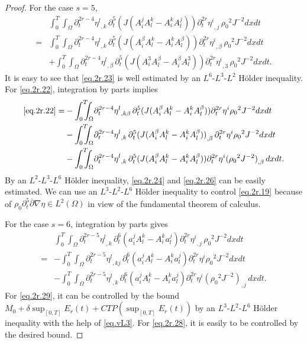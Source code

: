 \documentclass[12pt,twoside,reqno]{amsart}
\numberwithin{equation}{section}
\theoremstyle{definition}
\theoremstyle{remark}
\begin{document}
\begin{proof}
For the case $s=5$,
\begin{align}
  &{\int_0^T\!\!\!\!\int_\Omega } {\partial}_t^{2r-4}{{{\eta^l}}_{,{k}}\,}{\partial}_t^5(J(A_i^jA_l^k-A_i^kA_l^j)) {{{{\partial}_t^{2r}\eta^i}}_{,{j}}\,}{\rho_0}^2  J^{-2}dxdt\label{eq.2r.21}\\
  =&{\int_0^T\!\!\!\!\int_\Omega } {\partial}_t^{2r-4}{{{\eta^l}}_{,{k}}\,}{\partial}_t^5(J(A_i^\beta A_l^k-A_i^kA_l^\beta)) {{{{\partial}_t^{2r}\eta^i}}_{,{\beta}}\,}{\rho_0}^2  J^{-2}dxdt\label{eq.2r.22}\\
  &+{\int_0^T\!\!\!\!\int_\Omega } {\partial}_t^{2r-4}{{{\eta^l}}_{,{\beta}}\,}{\partial}_t^5(J(A_i^3A_l^\beta-A_i^\beta A_l^3)) {{{{\partial}_t^{2r}\eta^i}}_{,{3}}\,}{\rho_0}^2  J^{-2}dxdt.\label{eq.2r.23}
\end{align}
It is easy to see that \eqref{eq.2r.23} is well estimated by an $L^6$-$L^3$-$L^2$ H\"older inequality. For \eqref{eq.2r.22}, integration by parts implies
\begin{align}
  \eqref{eq.2r.22}=&-{\int_0^T\!\!\!\!\int_\Omega } {\partial}_t^{2r-4}{{{\eta^l}}_{,{k\beta}}\,}{\partial}_t^5(J(A_i^\beta A_l^k-A_i^kA_l^\beta)) {\partial}_t^{2r}\eta^i{\rho_0}^2  J^{-2}dxdt\label{eq.2r.24}\\
  &-{\int_0^T\!\!\!\!\int_\Omega } {\partial}_t^{2r-4}{{{\eta^l}}_{,{k}}\,}{\partial}_t^5{{{(J(A_i^\beta A_l^k-A_i^kA_l^\beta))}}_{,{\beta}}\,} {\partial}_t^{2r}\eta^i{\rho_0}^2  J^{-2}dxdt\label{eq.2r.25}\\
  &-{\int_0^T\!\!\!\!\int_\Omega } {\partial}_t^{2r-4}{{{\eta^l}}_{,{k}}\,}{\partial}_t^5(J(A_i^\beta A_l^k-A_i^kA_l^\beta)) {\partial}_t^{2r}\eta^i{{{({\rho_0}^2  J^{-2})}}_{,{\beta}}\,}dxdt.\label{eq.2r.26}
\end{align}
By an $L^2$-$L^3$-$L^6$ H\"older inequality, \eqref{eq.2r.24} and \eqref{eq.2r.26} can be easily estimated. We can use an $L^3$-$L^2$-$L^6$ H\"older inequality to control \eqref{eq.2r.19} because of ${\rho_0} {\partial}_t^5{\overline{\partial}}{\nabla}\eta\in L^2(\Omega)$ in view of the fundamental theorem of calculus.

For the case $s=6$, integration by parts gives
\begin{align}
  &{\int_0^T\!\!\!\!\int_\Omega } {\partial}_t^{2r-5}{{{\eta^l}}_{,{k}}\,}{\partial}_t^6(a_i^jA_l^k-A_i^ka_l^j) {{{{\partial}_t^{2r}\eta^i}}_{,{j}}\,}{\rho_0}^2  J^{-2}dxdt\label{eq.2r.27}\\
  =&-{\int_0^T\!\!\!\!\int_\Omega } {\partial}_t^{2r-5}{{{\eta^l}}_{,{kj}}\,}{\partial}_t^6(a_i^jA_l^k-A_i^ka_l^j) {\partial}_t^{2r}\eta^i{\rho_0}^2  J^{-2}dxdt\label{eq.2r.29}\\
  &-{\int_0^T\!\!\!\!\int_\Omega } {\partial}_t^{2r-5}{{{\eta^l}}_{,{k}}\,}{\partial}_t^6(a_i^jA_l^k-A_i^ka_l^j) {\partial}_t^{2r}\eta^i{{{({\rho_0}^2  J^{-2})}}_{,{j}}\,}dxdt.\label{eq.2r.28}
\end{align}
For \eqref{eq.2r.29}, it can be controlled by  the bound $M_0+\delta\sup_{[0,T]}E_r(t) +CTP(\sup_{[0,T]}E_r(t))$ by an $L^3$-$L^2$-$L^6$ H\"older inequality with the help of \eqref{eq.vL3}. For \eqref{eq.2r.28}, it is easily to be controlled by the desired bound.


\end{proof}
\end{document}
